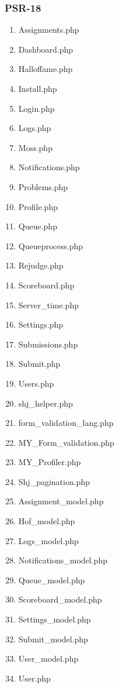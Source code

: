 \subsubsection{PSR-18}
\begin{enumerate}
	\item Assignments.php
	\item Dashboard.php
	\item Halloffame.php
	\item Install.php
	\item Login.php
	\item Logs.php
	\item Moss.php
	\item Notifications.php
	\item Problems.php
	\item Profile.php
	\item Queue.php
	\item Queueprocess.php
	\item Rejudge.php
	\item Scoreboard.php
	\item Server\_time.php
	\item Settings.php
	\item Submissions.php
	\item Submit.php
	\item Users.php
	\item shj\_helper.php
	\item form\_validation\_lang.php
	\item MY\_Form\_validation.php
	\item MY\_Profiler.php
	\item Shj\_pagination.php
	\item Assignment\_model.php
	\item Hof\_model.php
	\item Logs\_model.php
	\item Notifications\_model.php
	\item Queue\_model.php
	\item Scoreboard\_model.php
	\item Settings\_model.php
	\item Submit\_model.php
	\item User\_model.php
	\item User.php
\end{enumerate}


